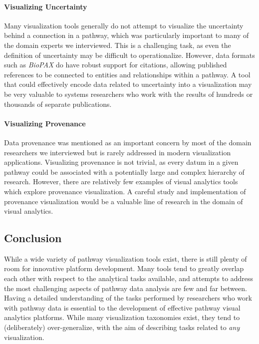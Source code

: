 \documentclass[twocolumn]{bmcart}%
\begin{document}





\paragraph{Visualizing Uncertainty}

Many visualization tools generally do not attempt to visualize the uncertainty behind a connection in a pathway, which was particularly important to many of the domain experts we interviewed.
This is a challenging task, as even the definition of uncertainty may be difficult to operationalize.
However, data formats such as \emph{BioPAX} do have robust support for citations, allowing published references to be connected to entities and relationships within a pathway.
A tool that could effectively encode data related to uncertainty into a visualization may be very valuable to systems researchers who work with the results of hundreds or thousands of separate publications.

\paragraph*{Visualizing Provenance}

Data provenance was mentioned as an important concern by most of the domain researchers we interviewed but is rarely addressed in modern visualization applications.
Visualizing provenance is not trivial, as every datum in a given pathway could be associated with a potentially large and complex hierarchy of research.
However, there are relatively few examples of visual analytics tools which explore provenance visualization.
A careful study and implementation of provenance visualization would be a valuable line of research in the domain of visual analytics.

\subsection*{Conclusion}

While a wide variety of pathway visualization tools exist, there is still plenty of room for innovative platform development.
Many tools tend to greatly overlap each other with respect to the analytical tasks available, and attempts to address the most challenging aspects of pathway data analysis are few and far between.
Having a detailed understanding of the tasks performed by researchers who work with pathway data is essential to the development of effective pathway visual analytics platforms.
While many visualization taxonomies exist, they tend to (deliberately) over-generalize, with the aim of describing tasks related to \textit{any} visualization.
\end{document}
